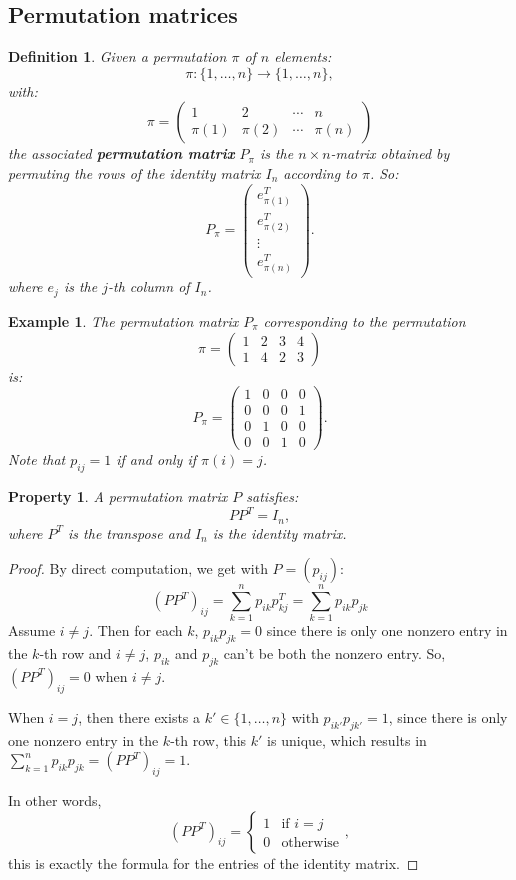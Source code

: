 \documentclass[a4paper,11pt]{report}
\newtheorem{example}[theorem]{Example}
\newtheorem{property}[theorem]{Property}
\newtheorem{definition}[theorem]{Definition}
\begin{document}
\subsection{Permutation matrices}
\begin{definition}\label{petmruation}
  Given a permutation $\pi$ of $n$ elements:
  $$\pi: \{1,\ldots,n\} \to \{1,\ldots,n\},$$
  with:
    $$\pi = \begin{pmatrix} 1 & 2 & \cdots & n \\ \pi(1) & \pi(2) & \cdots & \pi(n) \end{pmatrix} $$
  the associated \textbf{permutation matrix} $P_\pi$ is the $n\times n$-matrix 
  obtained by permuting the rows of the identity matrix $I_n$ according to $\pi$. 
  So:
 $$P_\pi = \begin{pmatrix} 
e^T_{\pi(1)}  \\
e^T_{\pi(2)}  \\
\vdots  \\
e^T_{\pi(n)}  
\end{pmatrix}.$$
 where $e_{j}$ is the $j$-th column of $I_n$.
 \end{definition}
\begin{example}
  The permutation matrix $P_\pi$ corresponding to the permutation  $$\pi = \begin{pmatrix} 1 & 2 & 3 & 4 \\ 1 & 4 & 2 & 3 \end{pmatrix} $$
  is:
  $$P_\pi = \begin{pmatrix} 
1 & 0 & 0 & 0  \\
0 & 0 & 0 & 1  \\
0 & 1 & 0 & 0  \\
0 & 0 & 1 & 0  
\end{pmatrix}.$$
Note that $p_{ij} = 1$ if and only if $\pi(i) = j$. 
\end{example}

\begin{property}\label{permutatie}
A permutation matrix $P$ satisfies:
  $$PP^T = I_n,$$
  where $P^T$ is the transpose and $I_n$ is the identity matrix.
\end{property}
\begin{proof}
By direct computation, we get with $P = (p_{ij})$:
$$(PP^T)_{ij} = \sum^n_{k=1}p_{ik}p^T_{kj} = \sum^n_{k=1}p_{ik}p_{jk}$$
Assume $i \not = j$. Then for each $k$, $p_{ik}p_{jk} = 0$ since there is only
one nonzero entry in the $k$-th row and $i \not = j$, $p_{ik}$ and $p_{jk}$ 
can't be both the nonzero entry. So, $(PP^T)_{ij} = 0$ when $i \not = j$.

When $i=j$, then there exists a $k' \in \{1,\ldots,n\}$ with $p_{ik'}p_{jk'} = 1$, 
since there is only one nonzero entry in the $k$-th row, this $k'$ is unique, 
which results in $\sum^n_{k=1}p_{ik}p_{jk} = (PP^T)_{ij} = 1$.

In other words,
$$(PP^T)_{ij} = \begin{cases} 1 &\mbox{if } i = j \\ 
0 & \mbox{otherwise} \end{cases},$$
this is exactly the formula for the entries of the identity matrix.
\end{proof}
\end{document}
